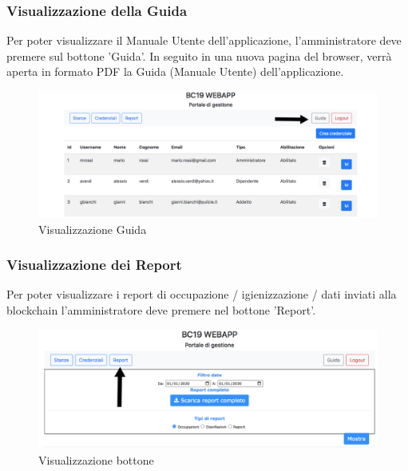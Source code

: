 \subsubsection{Visualizzazione della Guida}
Per poter visualizzare il Manuale Utente dell'applicazione, l'amministratore deve premere sul bottone 'Guida'. In seguito in una nuova pagina del browser, verrà aperta in formato PDF la Guida (Manuale Utente) dell'applicazione.
\begin{figure}[H]
	\centering
	\includegraphics[width=15cm]{res/images/guida.jpg}
	\caption{Visualizzazione Guida}
\end{figure}
\newpage
\subsubsection{Visualizzazione dei Report}
Per poter visualizzare i report di occupazione / igienizzazione / dati inviati alla blockchain l'amministratore deve premere nel bottone 'Report'.
\begin{figure}[H]
	\centering
	\includegraphics[width=15cm]{res/images/bottoneReport.png}
	\caption{Visualizzazione bottone}
\end{figure}
